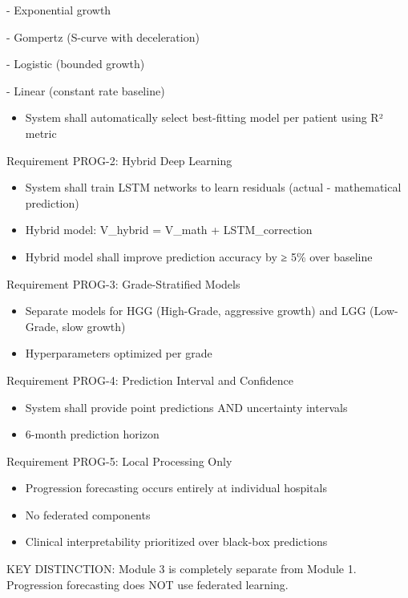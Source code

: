 - Exponential growth

- Gompertz (S-curve with deceleration)

- Logistic (bounded growth)

- Linear (constant rate baseline)

\begin{itemize}
  \item System shall automatically select best-fitting model per patient using R² metric
\end{itemize}

Requirement PROG-2: Hybrid Deep Learning

\begin{itemize}
  \item System shall train LSTM networks to learn residuals (actual - mathematical prediction)
  \item Hybrid model: V\_hybrid = V\_math + LSTM\_correction
  \item Hybrid model shall improve prediction accuracy by ≥ 5\% over baseline
\end{itemize}

Requirement PROG-3: Grade-Stratified Models

\begin{itemize}
  \item Separate models for HGG (High-Grade, aggressive growth) and LGG (Low-Grade, slow growth)
  \item Hyperparameters optimized per grade
\end{itemize}

Requirement PROG-4: Prediction Interval and Confidence

\begin{itemize}
  \item System shall provide point predictions AND uncertainty intervals
  \item 6-month prediction horizon
\end{itemize}

Requirement PROG-5: Local Processing Only

\begin{itemize}
  \item Progression forecasting occurs entirely at individual hospitals
  \item No federated components
  \item Clinical interpretability prioritized over black-box predictions
\end{itemize}

KEY DISTINCTION: Module 3 is completely separate from Module 1. Progression forecasting does NOT use federated learning.


